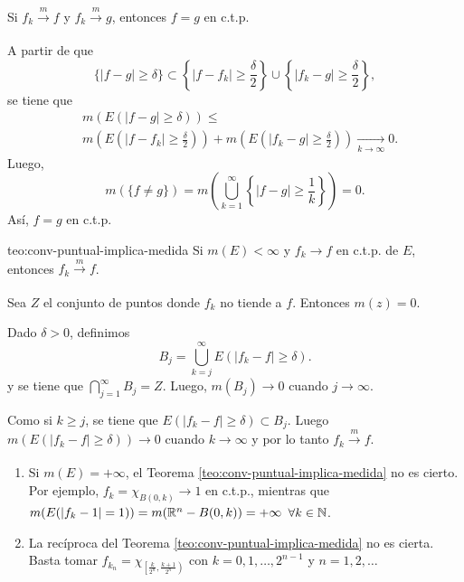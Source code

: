 \begin{teorema}{}
Si $f_k \xrightarrow[]{m}f$ y $f_k \xrightarrow[]{m} g$, entonces
$f=g$ en c.t.p.
\end{teorema}

\begin{demo}
A partir de que 
\[
\{|f-g|\geq \delta\} \subset 
\left\{|f-f_k|\geq\frac{\delta}{2}\right\} \cup \left\{|f_k-g|\geq\frac{\delta}{2}\right\}, 
\]
se tiene que 
\[
\begin{split}
&m\left(E\left(|f-g|\geq \delta\right)\right)\leq 
\\
&m\left(E\left(|f-f_k|\geq \frac{\delta}{2}\right)\right)+
m\left(E\left(|f_k-g|\geq \frac{\delta}{2}\right)\right) \xrightarrow[k \to \infty]{} 0.
\end{split}
\]
Luego, 
\[
m(\{f\neq g\})=
m\left( \bigcup\limits_{k=1}^{\infty} \left\{|f-g|\geq \frac{1}{k}  \right\} \right)=0.
\]
As\'i, $f=g$ en c.t.p.
\end{demo}


\begin{teorema}{teo:conv-puntual-implica-medida}
Si $m(E)<\infty$ y $f_k \to f$ en c.t.p. de $E$, entonces 
$f_k \xrightarrow[]{m}f$.
\end{teorema}


\begin{demo}
Sea $Z$ el conjunto de puntos donde $f_k$ no tiende a $f$. Entonces $m(z)=0$. 

Dado $\delta>0$, definimos 
\[
B_j=\bigcup\limits_{k=j}^{\infty} E(|f_k-f|\geq \delta).
\]
 y se tiene que $ \bigcap\limits_{j=1}^{\infty} B_j=Z.$
 Luego, $m(B_j)\to 0$ cuando $j \to \infty$.
 
 Como si $k \geq j$, se tiene que $E(|f_k-f|\geq \delta )\subset B_j$.
Luego $m(E(|f_k-f|\geq \delta))\to 0$ cuando $k \to \infty$
y por lo tanto $f_k \xrightarrow[]{m}f.$
\end{demo}

\begin{observacion}{}
\begin{enumerate}
    \item Si $m(E)=+\infty$, el Teorema \ref{teo:conv-puntual-implica-medida} no es cierto. 
    Por ejemplo,  $f_k=\chi_{B(0,k)} \to 1$ en c.t.p., mientras que 
    $m(E(|f_k-1|=1 ))=m(\mathbb{R}^n-B(0,k))= +\infty$\; $\forall k\in \mathbb{N}$.
    \item La rec\'iproca del Teorema \ref{teo:conv-puntual-implica-medida} no es cierta. 
    Basta tomar $f_{k_n}=\chi_{\left[\frac{k}{2^n}, \frac{k+1}{2^n}\right)}$ con 
    $k=0,1, \ldots, 2^{n-1}$ y $n=1,2,\ldots$
\end{enumerate}
\end{observacion}{}

